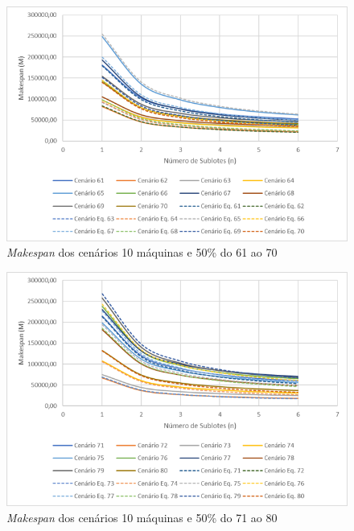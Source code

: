 \begin{figure}[H]
    \centering
     \includegraphics[width=13cm]{Apendices/Figuras/10m50_61-70.png}
     \caption{\textit{Makespan} dos cenários 10 máquinas e 50\% do 61 ao 70}
    \label{fig:10m50_61-70}
\end{figure}

\begin{figure}[H]
    \centering
     \includegraphics[width=13cm]{Apendices/Figuras/10m50_71-80.png}
     \caption{\textit{Makespan} dos cenários 10 máquinas e 50\% do 71 ao 80}
    \label{fig:10m50_71-80}
\end{figure}

